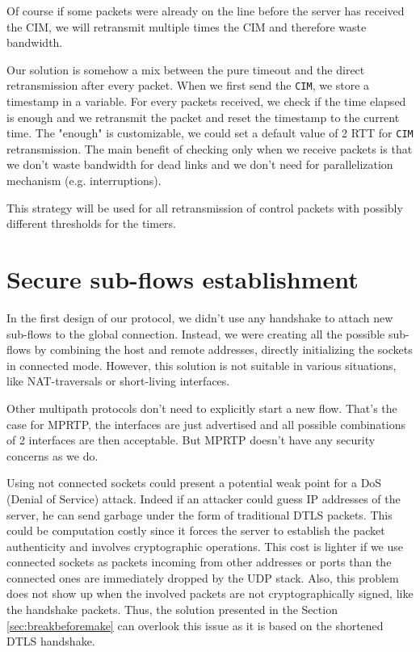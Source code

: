 Of course if some packets were already on the line before the server has received the CIM, we will retransmit multiple times the CIM and therefore waste bandwidth.

Our solution is somehow a mix between the pure timeout and the direct retransmission after every packet. When we first send the \texttt{CIM}, we store a timestamp in a variable. For every packets received, we check if the time elapsed is enough and we retransmit the packet and reset the timestamp to the current time. The "enough" is customizable, we could set a default value of 2 RTT for \texttt{CIM} retransmission. The main benefit of checking only when we receive packets is that we don't waste bandwidth for dead links and we don't need for parallelization mechanism (e.g. interruptions).

This strategy will be used for all retransmission of control packets with possibly different thresholds for the timers.

\section{Secure sub-flows establishment}

In the first design of our protocol, we didn't use any handshake to attach new sub-flows to the global connection. Instead, we were creating all the possible sub-flows by combining the host and remote addresses, directly initializing the sockets in connected mode. However, this solution is not suitable in various situations, like NAT-traversals or short-living interfaces. 

Other multipath protocols don't need to explicitly start a new flow. That's the case for MPRTP, the interfaces are just advertised and all possible combinations of 2 interfaces are then acceptable. But MPRTP doesn't have any security concerns as we do.

Using not connected sockets could present a potential weak point for a DoS (Denial of Service) attack. Indeed if an attacker could guess IP addresses of the server, he can send garbage under the form of traditional DTLS packets. This could be computation costly since it forces the server to establish the packet authenticity and involves cryptographic operations. This cost is lighter if we use connected sockets as packets incoming from other addresses or ports than the connected ones are immediately dropped by the UDP stack. Also, this problem does not show up when the involved packets are not cryptographically signed, like the handshake packets. Thus, the solution presented in the Section \ref{sec:breakbeforemake} can overlook this issue as it is based on the shortened DTLS handshake.

